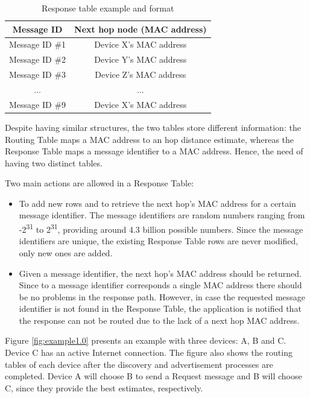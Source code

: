\begin{table}[ht]
\centering
\bgroup
\def\arraystretch{2.5}
\begin{tabular}{|c|c|}
\hline
\textbf{Message ID} & \textbf{Next hop node (MAC address)} \\ \hline
Message ID \#1 & Device X's MAC address \\ \hline
Message ID \#2 & Device Y's MAC address \\ \hline
Message ID \#3 & Device Z's MAC address \\ \hline
... & ... \\ \hline
Message ID \#9 & Device X's MAC address \\ \hline
\end{tabular}
\egroup
\caption{Response table example and format}
\label{tab:rspTables}
\end{table}

Despite having similar structures, the two tables store different information: the Routing Table maps a \gls{MAC} address to an hop distance estimate, whereas the Response Table maps a message identifier to a \gls{MAC} address. Hence, the need of having two distinct tables.

Two main actions are allowed in a Response Table:

\begin{itemize}
	\item To add new rows and to retrieve the next hop's \gls{MAC} address for a certain message identifier. The message identifiers are random numbers ranging from -2\textsuperscript{31} to 2\textsuperscript{31}, providing around 4.3 billion possible numbers. Since the message identifiers are unique, the existing Response Table rows are never modified, only new ones are added.
	
	\item Given a message identifier, the next hop's \gls{MAC} address should be returned. Since to a message identifier corresponds a single \gls{MAC} address there should be no problems in the response path. However, in case the requested message identifier is not found in the Response Table, the application is notified that the response can not be routed due to the lack of a next hop \gls{MAC} address.
\end{itemize}

Figure \ref{fig:example1.0} presents an example with three devices: A, B and C. Device C has an active Internet connection. The figure also shows the routing tables of each device after the discovery and advertisement processes are completed. Device A will choose B to send a Request message and B will choose C, since they provide the best estimates, respectively.

